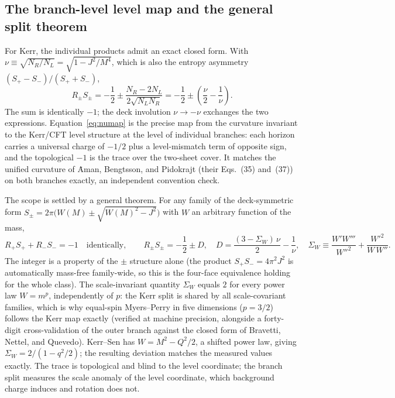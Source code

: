 \subsection{The branch-level level map and the general split theorem}
\label{ssec:numap}

For Kerr, the individual products admit an exact closed form. With $\nu \equiv \sqrt{N_R/N_L} = \sqrt{1 - J^2/M^4}$, which is also the entropy asymmetry $(S_+-S_-)/(S_++S_-)$,
\begin{equation}
R_\pm S_\pm = -\frac{1}{2} \pm \frac{N_R - 2N_L}{2\sqrt{N_L N_R}}
= -\frac{1}{2} \pm \left(\frac{\nu}{2} - \frac{1}{\nu}\right).
\label{eq:numap}
\end{equation}
The sum is identically $-1$; the deck involution $\nu \to -\nu$ exchanges the two expressions. Equation~\eqref{eq:numap} is the precise map from the curvature invariant to the Kerr/CFT level structure at the level of individual branches: each horizon carries a universal charge of $-1/2$ plus a level-mismatch term of opposite sign, and the topological $-1$ is the trace over the two-sheet cover. It matches the unified curvature of \.{A}man, Bengtsson, and Pidokrajt (their Eqs.~(35) and~(37)) on both branches exactly, an independent convention check.

The scope is settled by a general theorem. For any family of the deck-symmetric form $S_\pm = 2\pi\bigl(W(M) \pm \sqrt{W(M)^2 - J^2}\bigr)$ with $W$ an arbitrary function of the mass,
\begin{equation}
R_+S_+ + R_-S_- = -1 \quad\text{identically},
\qquad
R_\pm S_\pm = -\frac{1}{2} \pm D,
\quad
D = \frac{(3 - \Sigma_W)\,\nu}{2} - \frac{1}{\nu},
\quad
\Sigma_W \equiv \frac{W' W'''}{W''^2} + \frac{W'^2}{W\,W''}.
\label{eq:Wsplit}
\end{equation}
The integer is a property of the $\pm$ structure alone (the product $S_+S_- = 4\pi^2 J^2$ is automatically mass-free family-wide, so this is the four-face equivalence holding for the whole class). The scale-invariant quantity $\Sigma_W$ equals $2$ for every power law $W = m^p$, independently of $p$: the Kerr split is shared by all scale-covariant families, which is why equal-spin Myers--Perry in five dimensions ($p = 3/2$) follows the Kerr map exactly (verified at machine precision, alongside a forty-digit cross-validation of the outer branch against the closed form of Bravetti, Nettel, and Quevedo). Kerr--Sen has $W = M^2 - Q^2/2$, a shifted power law, giving $\Sigma_W = 2/(1 - q^2/2)$; the resulting deviation matches the measured values exactly. The trace is topological and blind to the level coordinate; the branch split measures the scale anomaly of the level coordinate, which background charge induces and rotation does not.

